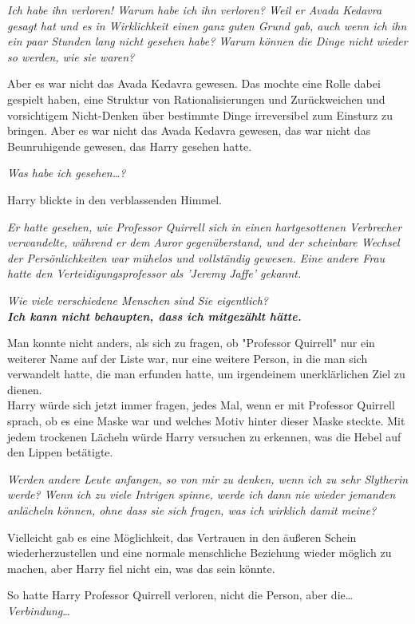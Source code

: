 {\emph{Ich habe ihn verloren! Warum habe ich ihn verloren? Weil er Avada Kedavra gesagt hat und es in Wirklichkeit einen ganz guten Grund gab, auch wenn ich ihn ein paar Stunden lang nicht gesehen habe? Warum können die Dinge nicht wieder so werden, wie sie waren?}

Aber es war nicht das Avada Kedavra gewesen. Das mochte eine Rolle dabei gespielt haben, eine Struktur von Rationalisierungen und Zurückweichen und vorsichtigem Nicht-Denken über bestimmte Dinge irreversibel zum Einsturz zu bringen. Aber es war nicht das Avada Kedavra gewesen, das war nicht das Beunruhigende gewesen, das Harry gesehen hatte.

\emph{Was habe ich gesehen…?}

Harry blickte in den verblassenden Himmel.

\emph{Er hatte gesehen, wie Professor Quirrell sich in einen hartgesottenen Verbrecher verwandelte, während er dem Auror gegenüberstand, und der scheinbare Wechsel der Persönlichkeiten war mühelos und vollständig gewesen. Eine andere Frau hatte den Verteidigungsprofessor als 'Jeremy Jaffe' gekannt.}

\emph{Wie viele verschiedene Menschen sind Sie eigentlich?}\\ \emph{\textbf{Ich kann nicht behaupten, dass ich mitgezählt hätte.}}

Man konnte nicht anders, als sich zu fragen, ob "Professor Quirrell" nur ein weiterer Name auf der Liste war, nur eine weitere Person, in die man sich verwandelt hatte, die man erfunden hatte, um irgendeinem unerklärlichen Ziel zu dienen.\\ Harry würde sich jetzt immer fragen, jedes Mal, wenn er mit Professor Quirrell sprach, ob es eine Maske war und welches Motiv hinter dieser Maske steckte. Mit jedem trockenen Lächeln würde Harry versuchen zu erkennen, was die Hebel auf den Lippen betätigte.

\emph{Werden andere Leute anfangen, so von mir zu denken, wenn ich zu sehr Slytherin werde? Wenn ich zu viele Intrigen spinne, werde ich dann nie wieder jemanden anlächeln können, ohne dass sie sich fragen, was ich wirklich damit meine?}

Vielleicht gab es eine Möglichkeit, das Vertrauen in den äußeren Schein wiederherzustellen und eine normale menschliche Beziehung wieder möglich zu machen, aber Harry fiel nicht ein, was das sein könnte.

So hatte Harry Professor Quirrell verloren, nicht die Person, aber die… \emph{Verbindung}…

}
